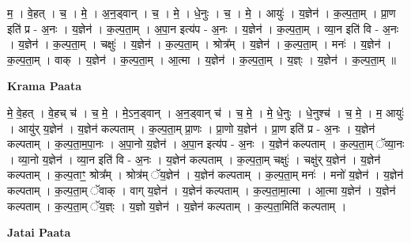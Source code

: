 \documentclass[17pt]{extarticle}
\begin{document}
म॒ । वे॒हत् । च॒ । मे॒ । अ॒न॒ड्वान् । च॒ । मे॒ । धे॒नुः । च॒ । मे॒ । आयुः॑ । य॒ज्ञेन॑ । क॒ल्प॒ता॒म् । प्रा॒ण इति॑ प्र - अ॒नः । य॒ज्ञेन॑ । क॒ल्प॒ता॒म् । अ॒पा॒न इत्य॑प - अ॒नः । य॒ज्ञेन॑ । क॒ल्प॒ता॒म् । व्या॒न इति॑ वि - अ॒नः । य॒ज्ञेन॑ । क॒ल्प॒ता॒म् । चक्षुः॑ । य॒ज्ञेन॑ । क॒ल्प॒ता॒म् । श्रोत्र᳚म् । य॒ज्ञेन॑ । क॒ल्प॒ता॒म् । मनः॑ । य॒ज्ञेन॑ । क॒ल्प॒ता॒म् । वाक् । य॒ज्ञेन॑ । क॒ल्प॒ता॒म् । आ॒त्मा । य॒ज्ञेन॑ । क॒ल्प॒ता॒म् । य॒ज्ञ्ः । य॒ज्ञेन॑ । क॒ल्प॒ता॒म् ॥  \newline


\textbf{Krama Paata} \newline

मे॒ वे॒हत् । वे॒हच् च॑ । च॒ मे॒ । मे॒ऽन॒ड्वान् । अ॒न॒ड्वान् च॑ । च॒ मे॒ । मे॒ धे॒नुः । धे॒नुश्च॑ । च॒ मे॒ । म॒ आयुः॑ । आयु॑र् य॒ज्ञेन॑ । य॒ज्ञेन॑ कल्पताम् । क॒ल्प॒ता॒म् प्रा॒णः । प्रा॒णो य॒ज्ञेन॑ । प्रा॒ण इति॑ प्र - अ॒नः । य॒ज्ञेन॑ कल्पताम् । क॒ल्प॒ता॒म॒पा॒नः । अ॒पा॒नो य॒ज्ञेन॑ । अ॒पा॒न इत्य॑प - अ॒नः । य॒ज्ञेन॑ कल्पताम् । क॒ल्प॒ता॒म् ॅव्या॒नः । व्या॒नो य॒ज्ञेन॑ । व्या॒न इति॑ वि - अ॒नः । य॒ज्ञेन॑ कल्पताम् । क॒ल्प॒ता॒म् चक्षुः॑ । चक्षु॑र् य॒ज्ञेन॑ । य॒ज्ञेन॑ कल्पताम् । क॒ल्प॒ताꣳ॒॒ श्रोत्र᳚म् । श्रोत्र॑म् ॅय॒ज्ञेन॑ । य॒ज्ञेन॑ कल्पताम् । क॒ल्प॒ता॒म् मनः॑ । मनो॑ य॒ज्ञेन॑ । य॒ज्ञेन॑ कल्पताम् । क॒ल्प॒ता॒म् ॅवाक् । वाग् य॒ज्ञेन॑ । य॒ज्ञेन॑ कल्पताम् । क॒ल्प॒ता॒मा॒त्मा । आ॒त्मा य॒ज्ञेन॑ । य॒ज्ञेन॑ कल्पताम् । क॒ल्प॒ता॒म् ॅय॒ज्ञ्ः । य॒ज्ञो य॒ज्ञेन॑ । य॒ज्ञेन॑ कल्पताम् । क॒ल्प॒ता॒मिति॑ कल्पताम् । \newline

\textbf{Jatai Paata} \newline
\end{document}
